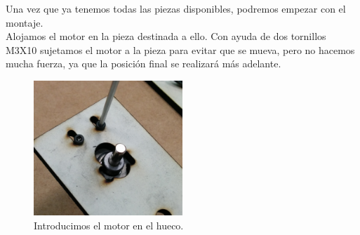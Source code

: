  Una vez que ya tenemos todas las piezas disponibles, podremos empezar con el montaje.\\

Alojamos el motor en la pieza destinada a ello. Con ayuda de dos tornillos M3X10 sujetamos el motor a la pieza para evitar que se mueva, pero no hacemos mucha fuerza, ya que la posición final se realizará más adelante.

    \begin{figure}[H]
            \centering
            \includegraphics[width=0.5\textwidth]{images/filawinder/montaje1.png}
            \caption{Introducimos el motor en el hueco.}
            \label{fig:winder_piezas1}
    \end{figure}

